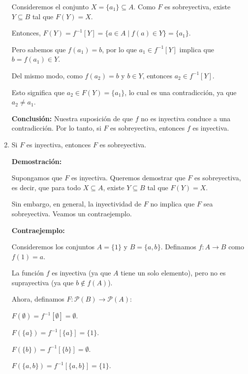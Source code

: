 \begin{solution}
\begin{enumerate}
        Consideremos el conjunto \( X = \{ a_1 \} \subseteq A \). Como \( F \) es sobreyectiva, existe \( Y \subseteq B \) tal que \( F(Y) = X \).
        
        Entonces, \( F(Y) = f^{-1}[Y] = \{ a \in A \mid f(a) \in Y \} = \{ a_1 \} \).
        
        Pero sabemos que \( f(a_1) = b \), por lo que \( a_1 \in f^{-1}[Y] \) implica que \( b = f(a_1) \in Y \).
        
        Del mismo modo, como \( f(a_2) = b \) y \( b \in Y \), entonces \( a_2 \in f^{-1}[Y] \).
        
        Esto significa que \( a_2 \in F(Y) = \{ a_1 \} \), lo cual es una contradicción, ya que \( a_2 \neq a_1 \).
        
        \textbf{Conclusión:} Nuestra suposición de que \( f \) no es inyectiva conduce a una contradicción. Por lo tanto, si \( F \) es sobreyectiva, entonces \( f \) es inyectiva.
        
        \item Si \( F \) es inyectiva, entonces \( F \) es sobreyectiva.
        
        \textbf{Demostración:}
        
        Supongamos que \( F \) es inyectiva. Queremos demostrar que \( F \) es sobreyectiva, es decir, que para todo \( X \subseteq A \), existe \( Y \subseteq B \) tal que \( F(Y) = X \).
        
        Sin embargo, en general, la inyectividad de \( F \) no implica que \( F \) sea sobreyectiva. Veamos un contraejemplo.
        
        \textbf{Contraejemplo:}
        
        Consideremos los conjuntos \( A = \{1\} \) y \( B = \{a, b\} \). Definamos \( f : A \rightarrow B \) como \( f(1) = a \).
        
        La función \( f \) es inyectiva (ya que \( A \) tiene un solo elemento), pero no es suprayectiva (ya que \( b \notin f(A) \)).
        
        Ahora, definamos \( F : \mathcal{P}(B) \rightarrow \mathcal{P}(A) \):
        
        \( F(\emptyset) = f^{-1}[\emptyset] = \emptyset \).
        
        \( F(\{a\}) = f^{-1}[\{a\}] = \{1\} \).
        
        \( F(\{b\}) = f^{-1}[\{b\}] = \emptyset \).
        
        \( F(\{a, b\}) = f^{-1}[\{a, b\}] = \{1\} \).
        

\end{enumerate}
\end{solution}
